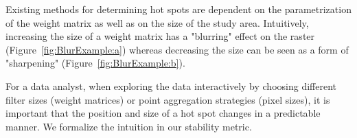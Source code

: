 \documentclass{itatnew}
\begin{document}
Existing methods for determining hot spots are dependent on the parametrization
of the weight matrix as well as on the size of the study area. Intuitively,
increasing the size of a weight matrix has a "blurring" effect on the raster
(Figure~\ref{fig:BlurExample:a}) whereas decreasing the size can be 
seen as a form of "sharpening" (Figure~\ref{fig:BlurExample:b}).



For a data analyst, when exploring the data interactively by choosing different
filter sizes (weight matrices) or point aggregation strategies (pixel sizes), it
is important that the position and size of a hot spot changes in a predictable
manner. We formalize the intuition in our stability metric.
\end{document}
